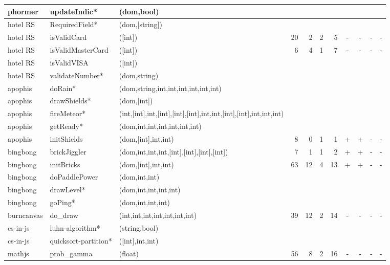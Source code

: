 \documentclass[sigconf]{acmart}
\begin{document}
\begin{table*}
\begin{tabular}{l|l|l|r|r|r|r|c|c|c|c}
    phormer    & updateIndic* & (dom,bool)                                 &    &    &   &    &   &   &   & \\
    \midrule
    hotel RS    & RequiredField* & (dom,[string])                           &    &    &   &    &   &   &   & \\
    hotel RS   & isValidCard & ([int])                                    & 20 & 2  & 2 & 5  & - & - & - & - \\
    hotel RS   & isValidMasterCard & ([int])                              & 6  & 4  & 1 & 7  & - & - & - & - \\
    hotel RS    & isValidVISA & ([int])                                    &    &    &   &    &   &   &   & \\
    hotel RS    & validateNumber* & (dom,string)                            &    &    &   &    &   &   &   & \\
    \midrule
    apophis    & doRain* & (dom,string,int,int,int,int,int,int)            &    &    &   &    &   &   &   & \\
    apophis    & drawShields* & (dom,[int])                                &    &    &   &    &   &   &   & \\
    apophis    & fireMeteor* & (int,[int],int,[int],[int],[int],int,int,[int],[int],int,int,int) &    &    &   &    &   &   &   & \\
    apophis    & getReady* & (dom,int,int,int,int,int,int)                 &    &    &   &    &   &   &   & \\
    apophis    & initShields & (dom,[int],int,int)                        & 8  & 0  & 1 & 1  & + & + & - & -\\
    \midrule
    bingbong   & brickJiggler & (dom,int,int,int,[int],[int],[int],[int]) & 7  & 1  & 1 & 2  & + & + & - & - \\
    bingbong   & initBricks & (dom,[int],int,int)                         & 63 & 12 & 4 & 13 & + & + & - & - \\
    bingbong   & doPaddlePower & (dom,int,int)                            &    &    &   &    &   &   &   & \\
    bingbong   & drawLevel* & (dom,int,int,int,int)                        &    &    &   &    &   &   &   & \\
    bingbong   & goPing* & (dom,int,int,int)                               &    &    &   &    &   &   &   & \\
    \midrule
    burncanvas & do\_draw & (int,int,int,int,int,int,int)                 & 39 & 12 & 2 & 14 & - & - & - & - \\
    \midrule
    cs-in-js   & luhn-algorithm* & (string,bool)                           &    &    &   &    &   &   &   & \\
    cs-in-js   & quicksort-partition* & ([int],int,int)                    &    &    &   &    &   &   &   & \\ 
    \midrule
    mathjs     & prob\_gamma & (float)                                    & 56 & 8  & 2 & 16 & - & - & - & - \\
    \bottomrule
  \end{tabular}
\end{table*}
\end{document}
